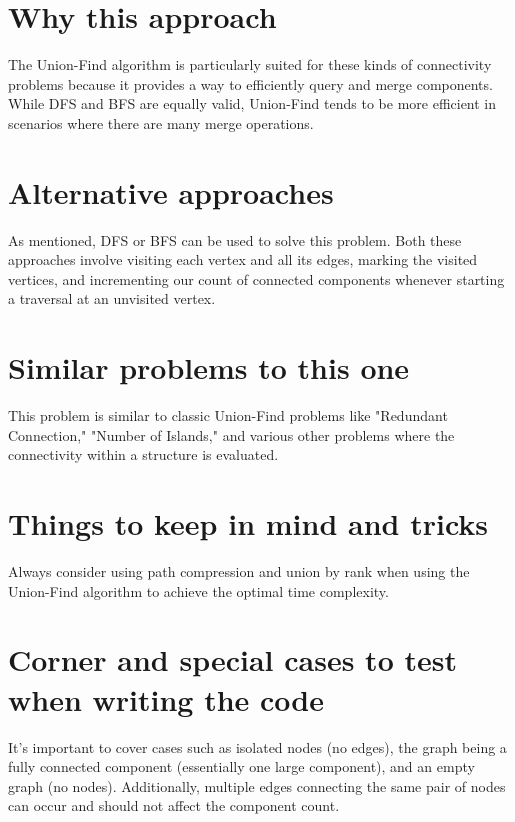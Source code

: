 \section*{Why this approach}
The Union-Find algorithm is particularly suited for these kinds of connectivity problems because it provides a way to efficiently query and merge components. While DFS and BFS are equally valid, Union-Find tends to be more efficient in scenarios where there are many merge operations.

\section*{Alternative approaches}
As mentioned, DFS or BFS can be used to solve this problem. Both these approaches involve visiting each vertex and all its edges, marking the visited vertices, and incrementing our count of connected components whenever starting a traversal at an unvisited vertex.

\section*{Similar problems to this one}
This problem is similar to classic Union-Find problems like "Redundant Connection," "Number of Islands," and various other problems where the connectivity within a structure is evaluated.

\section*{Things to keep in mind and tricks}
Always consider using path compression and union by rank when using the Union-Find algorithm to achieve the optimal time complexity. 

\section*{Corner and special cases to test when writing the code}
It's important to cover cases such as isolated nodes (no edges), the graph being a fully connected component (essentially one large component), and an empty graph (no nodes). Additionally, multiple edges connecting the same pair of nodes can occur and should not affect the component count.